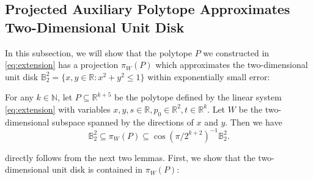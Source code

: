 \documentclass{article}\usepackage[a4paper,margin=20mm]{geometry}
\newcommand{\R}{\mathbb R}
\newcommand{\N}{\mathbb N}
\newcommand{\ball}{\mathbb{B}_2}
\renewcommand{\subset}{\subseteq}
\begin{document}
\subsection{Projected Auxiliary Polytope Approximates Two-Dimensional Unit Disk}\label{sec:lb-radius-proj}

In this subsection, we will show that the polytope $P$ we constructed in
\eqref{eq:extension} has a projection $\pi_W(P)$ which approximates
the two-dimensional unit disk $\ball^2 = \{x, y \in \R: x^2 + y^2 \leq 1\}$
within exponentially small error:

\begin{lemma}\label{lem:lb-radius-piwP}
For any $k \in \N$,
let $P \subset \R^{k+5}$ be the polytope defined by the linear system \eqref{eq:extension} with variables $x, y, s \in \R, p_0 \in \R^2, t \in \R^k$.
Let $W$ be the two-dimensional subspace spanned by the directions of $x$ and $y$. Then we have
\[
\ball^2 \subset \pi_W(P) \subset \cos(\pi/2^{k+2})^{-1}\ball^{2}.
\]
\end{lemma}


 directly follows from the next two lemmas.
First, we show that the two-dimensional unit disk is contained in $\pi_W(P)$:
\end{document}
